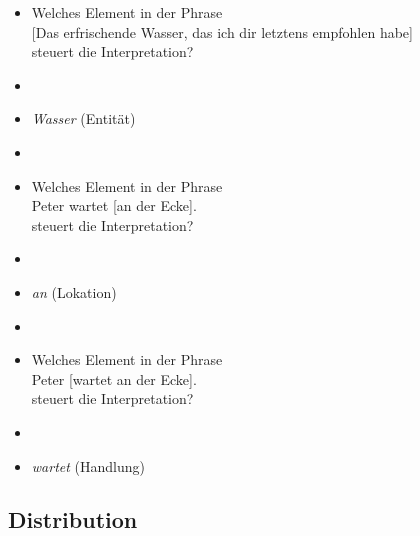 \begin{frame}

\begin{itemize}
	\item Welches Element in der Phrase\\
	{[}Das erfrischende Wasser, das ich dir letztens empfohlen habe]\\
	steuert die Interpretation?
	\item[] \pause
	\item[\ra] \emph{Wasser} (Entität)
	\item[] \pause
	\item Welches Element in der Phrase\\
	Peter wartet \alert{[an der Ecke]}.\\
	steuert die Interpretation?
	\item[] \pause
	\item[\ra] \emph{an} (Lokation)
	\item[] \pause
	\item Welches Element in der Phrase\\
	Peter \alert{[wartet an der Ecke]}.\\
	steuert die Interpretation?
	\item[] \pause
	\item[\ra] \emph{wartet} (Handlung)

\end{itemize}

\end{frame}


\subsection{Distribution}

